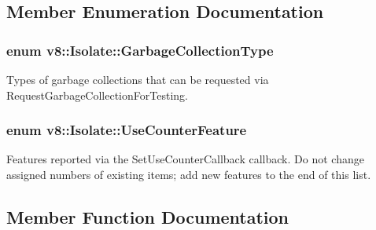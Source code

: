 \subsection{Member Enumeration Documentation}
\subsubsection[{\texorpdfstring{Garbage\+Collection\+Type}{GarbageCollectionType}}]{\setlength{\rightskip}{0pt plus 5cm}enum {\bf v8\+::\+Isolate\+::\+Garbage\+Collection\+Type}}\hypertarget{classv8_1_1_isolate_a5ae00cc99d8aca148c6f5f9698c432c9}{}\label{classv8_1_1_isolate_a5ae00cc99d8aca148c6f5f9698c432c9}
Types of garbage collections that can be requested via Request\+Garbage\+Collection\+For\+Testing. 
\subsubsection[{\texorpdfstring{Use\+Counter\+Feature}{UseCounterFeature}}]{\setlength{\rightskip}{0pt plus 5cm}enum {\bf v8\+::\+Isolate\+::\+Use\+Counter\+Feature}}\hypertarget{classv8_1_1_isolate_aed6909379c3f2820cb3084710b73385d}{}\label{classv8_1_1_isolate_aed6909379c3f2820cb3084710b73385d}
Features reported via the Set\+Use\+Counter\+Callback callback. Do not change assigned numbers of existing items; add new features to the end of this list. 

\subsection{Member Function Documentation}
